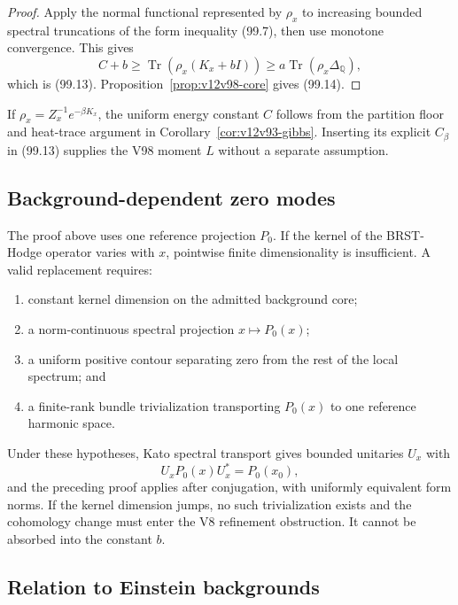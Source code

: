 \documentclass[11pt]{article}
\theoremstyle{remark}
\begin{document}
\begin{proof}
Apply the normal functional represented by \(\rho_x\) to increasing
bounded spectral truncations of the form inequality (99.7), then
use monotone convergence.  This gives
\[
 C+b\geq
 \operatorname{Tr}(\rho_x(K_x+bI))
 \geq a\operatorname{Tr}(\rho_x\Delta_{\mathbb Q}),
\]
which is (99.13).  Proposition~\ref{prop:v12v98-core} gives
(99.14).
\end{proof}

If \(\rho_x=Z_x^{-1}e^{-\beta K_x}\), the uniform energy constant
\(C\) follows from the partition floor and heat-trace argument in
Corollary~\ref{cor:v12v93-gibbs}.  Inserting its explicit
\(C_\beta\) in (99.13) supplies the V98 moment \(L\) without a
separate assumption.

\subsection{Background-dependent zero modes}

The proof above uses one reference projection \(P_0\).  If the
kernel of the BRST-Hodge operator varies with \(x\), pointwise
finite dimensionality is insufficient.  A valid replacement
requires:

\begin{enumerate}
\item constant kernel dimension on the admitted background core;
\item a norm-continuous spectral projection \(x\mapsto P_0(x)\);
\item a uniform positive contour separating zero from the rest of
the local spectrum; and
\item a finite-rank bundle trivialization transporting \(P_0(x)\)
to one reference harmonic space.
\end{enumerate}

Under these hypotheses, Kato spectral transport gives bounded
unitaries \(U_x\) with
\[
 U_xP_0(x)U_x^*=P_0(x_0),                                      \tag{99.15}
\]
and the preceding proof applies after conjugation, with uniformly
equivalent form norms.  If the kernel dimension jumps, no such
trivialization exists and the cohomology change must enter the V8
refinement obstruction.  It cannot be absorbed into the constant
\(b\).

\subsection{Relation to Einstein backgrounds}
\end{document}
